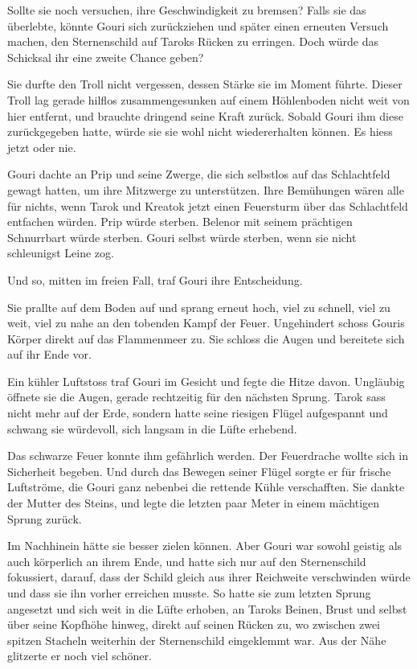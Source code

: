 \documentclass[10pt, a4paper, oneside]{book}
\begin{document}
Sollte sie noch versuchen, ihre Geschwindigkeit zu bremsen? Falls sie das überlebte, könnte Gouri sich zurückziehen und später einen erneuten Versuch machen, den Sternenschild auf Taroks Rücken zu erringen. Doch würde das Schicksal ihr eine zweite Chance geben?

Sie durfte den Troll nicht vergessen, dessen Stärke sie im Moment führte. Dieser Troll lag gerade hilflos zusammengesunken auf einem Höhlenboden nicht weit von hier entfernt, und brauchte dringend seine Kraft zurück. Sobald Gouri ihm diese zurückgegeben hatte, würde sie sie wohl nicht wiedererhalten können. Es hiess jetzt oder nie.

Gouri dachte an Prip und seine Zwerge, die sich selbstlos auf das Schlachtfeld gewagt hatten, um ihre Mitzwerge zu unterstützen. Ihre Bemühungen wären alle für nichts, wenn Tarok und Kreatok jetzt einen Feuersturm über das Schlachtfeld entfachen würden. Prip würde sterben. Belenor mit seinem prächtigen Schnurrbart würde sterben. Gouri selbst würde sterben, wenn sie nicht schleunigst Leine zog.

Und so, mitten im freien Fall, traf Gouri ihre Entscheidung.

Sie prallte auf dem Boden auf und sprang erneut hoch, viel zu schnell, viel zu weit, viel zu nahe an den tobenden Kampf der Feuer. Ungehindert schoss Gouris Körper direkt auf das Flammenmeer zu. Sie schloss die Augen und bereitete sich auf ihr Ende vor.

Ein kühler Luftstoss traf Gouri im Gesicht und fegte die Hitze davon. Ungläubig öffnete sie die Augen, gerade rechtzeitig für den nächsten Sprung. Tarok sass nicht mehr auf der Erde, sondern hatte seine riesigen Flügel aufgespannt und schwang sie würdevoll, sich langsam in die Lüfte erhebend.

Das schwarze Feuer konnte ihm gefährlich werden. Der Feuerdrache wollte sich in Sicherheit begeben. Und durch das Bewegen seiner Flügel sorgte er für frische Luftströme, die Gouri ganz nebenbei die rettende Kühle verschafften. Sie dankte der Mutter des Steins, und legte die letzten paar Meter in einem mächtigen Sprung zurück.

Im Nachhinein hätte sie besser zielen können. Aber Gouri war sowohl geistig als auch körperlich an ihrem Ende, und hatte sich nur auf den Sternenschild fokussiert, darauf, dass der Schild gleich aus ihrer Reichweite verschwinden würde und dass sie ihn vorher erreichen musste. So hatte sie zum letzten Sprung angesetzt und sich weit in die Lüfte erhoben, an Taroks Beinen, Brust und selbst über seine Kopfhöhe hinweg, direkt auf seinen Rücken zu, wo zwischen zwei spitzen Stacheln weiterhin der Sternenschild eingeklemmt war. Aus der Nähe glitzerte er noch viel schöner.
\end{document}
